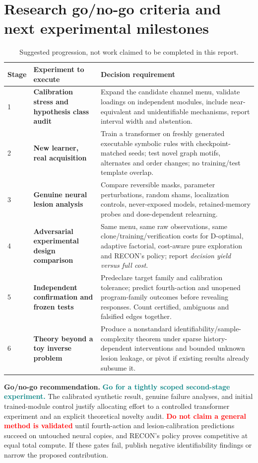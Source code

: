\documentclass[10.5pt,a4paper]{article}
\newcommand{\sig}[1]{\textcolor{teal}{\textbf{#1}}}
\newcommand{\risk}[1]{\textcolor{red}{\textbf{#1}}}
\begin{document}
\section{Research go/no-go criteria and next experimental milestones}
\begin{table}[H]\centering\small
\begin{tabularx}{\linewidth}{p{.08\linewidth}p{.29\linewidth}Y}
\toprule
\textbf{Stage} & \textbf{Experiment to execute} & \textbf{Decision requirement}\\ & \textbf{Calibration stress and hypothesis class audit} & Expand the candidate channel menu, validate loadings on independent modules, include near-equivalent and unidentifiable mechanisms, report interval width and abstention.\\
2 & \textbf{New learner, real acquisition} & Train a transformer on freshly generated executable symbolic rules with checkpoint-matched seeds; test novel graph motifs, alternates and order changes; no training/test template overlap.\\
3 & \textbf{Genuine neural lesion analysis} & Compare reversible masks, parameter perturbations, random shams, localization controls, never-exposed models, retained-memory probes and dose-dependent relearning.\\
4 & \textbf{Adversarial experimental design comparison} & Same menu, same raw observations, same clone/training/verification costs for D-optimal, adaptive factorial, cost-aware pure exploration and RECON's policy; report \emph{decision yield versus full cost}.\\
5 & \textbf{Independent confirmation and frozen tests} & Predeclare target family and calibration tolerance; predict fourth-action and unopened program-family outcomes before revealing responses. Count certified, ambiguous and falsified edges together.\\
6 & \textbf{Theory beyond a toy inverse problem} & Produce a nonstandard identifiability/sample-complexity theorem under sparse history-dependent interventions and bounded unknown lesion leakage, or pivot if existing results already subsume it.\\
\bottomrule
\end{tabularx}
\caption{Suggested progression, not work claimed to be completed in this report.}\end{table}

\begin{resultbox}
\textbf{Go/no-go recommendation.} \sig{Go for a tightly scoped second-stage experiment.} The calibrated synthetic result, genuine failure analyses, and initial trained-module control justify allocating effort to a controlled transformer experiment and an explicit theoretical novelty audit. \risk{Do not claim a general method is validated} until fourth-action and lesion-calibration predictions succeed on untouched neural copies, and RECON's policy proves competitive at equal total compute. If these gates fail, publish negative identifiability findings or narrow the proposed contribution.
\end{resultbox}
\end{document}
